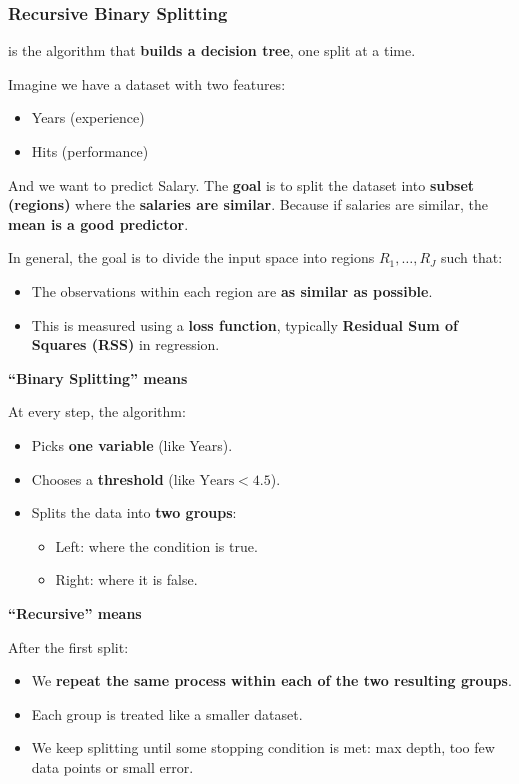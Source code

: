 \subsubsection{Recursive Binary Splitting}\label{subsubsection: Recursive Binary Splitting}

 is the algorithm that \textbf{builds a decision tree}, one split at a time.

\highspace
Imagine we have a dataset with two features:
\begin{itemize}
    \item Years (experience)
    \item Hits (performance)
\end{itemize}
And we want to predict Salary. The \textbf{goal} is to split the dataset into \textbf{subset (regions)} where the \textbf{salaries are similar}. Because if salaries are similar, the \textbf{mean is a good predictor}.

\highspace
In general, the goal is to divide the input space into regions $R_1, \dots, R_J$ such that:
\begin{itemize}
    \item The observations within each region are \textbf{as similar as possible}.
    \item This is measured using a \textbf{loss function}, typically \textbf{Residual Sum of Squares (RSS)} in regression.
\end{itemize}

\highspace
\begin{flushleft}
    \textcolor{Green3}{ \textbf{``Binary Splitting'' means}}
\end{flushleft}
At every step, the algorithm:
\begin{itemize}
    \item Picks \textbf{one variable} (like Years).
    \item Chooses a \textbf{threshold} (like $\text{Years} < 4.5$).
    \item Splits the data into \textbf{two groups}:
    \begin{itemize}
        \item Left: where the condition is true.
        \item Right: where it is false.
    \end{itemize}
\end{itemize}

\highspace
\begin{flushleft}
    \textcolor{Green3}{ \textbf{``Recursive'' means}}
\end{flushleft}
After the first split:
\begin{itemize}
    \item We \textbf{repeat the same process within each of the two resulting groups}.
    \item Each group is treated like a smaller dataset.
    \item We keep splitting until some stopping condition is met: max depth, too few data points or small error.
\end{itemize}

